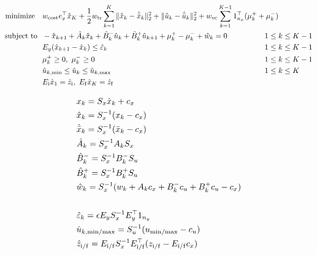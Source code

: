 \documentclass[11pt,a4paper]{article}
\begin{document}
\begin{subequations}
\begin{align}
    \mr{minimize}~~&~w_{\mr{cost}}e_x^\top\hat{x}_K + \frac{1}{2}w_{\mr{tr}}\sum_{k=1}^K \|\hat{x}_k - \hat{\bar{x}}_k\|_2^2 + \|\hat{u}_k - \hat{\bar{u}}_k\|_2^2 + w_{\mr{vc}}\sum_{k=1}^{K-1}1_{n_x}^\top(\mu^+_k+\mu_k^-) & &  \\
    \mr{subject~to}~&~-\hat{x}_{k+1} + \hat{A}_k\hat{x}_k + \hat{B}^-_k\hat{u}_k + \hat{B}^+_k\hat{u}_{k+1} + \mu_k^+ - \mu_k^- + \hat{w}_k = 0 & & \hspace{-1cm}1 \le k \le K-1\\
     &~E_{y}(\hat{x}_{k+1}-\hat{x}_{k}) \le \hat{\varepsilon}_k & & \hspace{-1cm}1 \le k \le K-1\\
     &~\mu_k^+\ge 0,~\mu^-_k\ge 0 & &  \hspace{-1cm}1 \le k \le K-1 \\
     &~\hat{u}_{k,\min} \le \hat{u}_k \le \hat{u}_{k,\max} & &  \hspace{-1cm}1 \le k \le K\\
     &~E_{\mr{i}}\hat{x}_1 = \hat{z}_{\mr{i}},~E_{\mr{f}}\hat{x}_K = \hat{z}_{\mr{f}} 
\end{align}
\end{subequations}
%
\begin{minipage}[t]{0.48\linewidth}
    \begin{align*}
        & x_k = S_x \hat{x}_k + c_x\\
        & \hat{x}_k = S_x^{-1}(x_k-c_x)\\
        & \hat{\bar{x}}_k = S_x^{-1}(\bar{x}_k-c_x)\\
        & \hat{A}_k = S_x^{-1}A_kS_x\\
        & \hat{B}^-_k = S_x^{-1}B^-_kS_u\\
        & \hat{B}^+_k = S_x^{-1}B^+_kS_u\\
        & \hat{w}_k = S_x^{-1}(w_k+A_kc_x+B_k^{-}c_u + B_k^{+}c_u - c_x)\\
        & \phantom{\hat{w}_k = S_x^{-1}(\bar{x}^{k}(\tau_{k+1})-\bar{x}_{k+1})}\\        
        & \hat{\varepsilon}_k = \epsilon E_y S_x^{-1}E_y^\top 1_{n_y}\\
        & \hat{u}_{k,\min\!/\!\max} = S_u^{-1}(u_{\min\!/\!\max}-c_u)\\
        & \hat{z}_{\mr{i}/\mr{f}} = E_{\mr{i}/\mr{f}}S_x^{-1}E_{\mr{i}/\mr{f}}^\top(z_{\mr{i}/\mr{f}} - E_{\mr{i}/\mr{f}}c_x)
    \end{align*}
\end{minipage}
\end{document}

